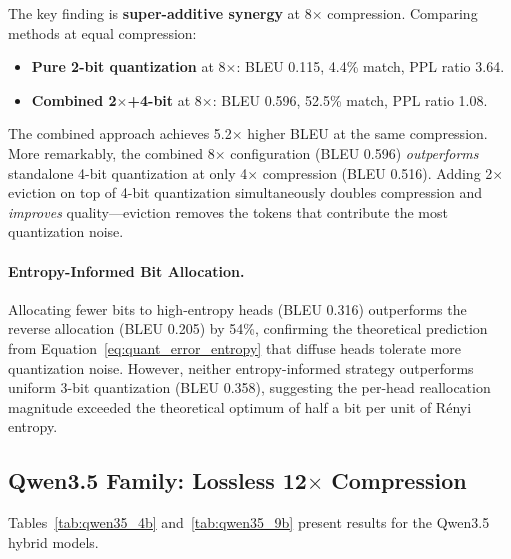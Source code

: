 \documentclass[11pt]{article}
\begin{document}
The key finding is \textbf{super-additive synergy} at 8$\times$ compression.  Comparing methods at equal compression:
\begin{itemize}[leftmargin=*]
    \item \textbf{Pure 2-bit quantization} at 8$\times$: BLEU 0.115, 4.4\% match, PPL ratio 3.64.
    \item \textbf{Combined 2$\times$+4-bit} at 8$\times$: BLEU 0.596, 52.5\% match, PPL ratio 1.08.
\end{itemize}
The combined approach achieves 5.2$\times$ higher BLEU at the same compression.  More remarkably, the combined 8$\times$ configuration (BLEU 0.596) \emph{outperforms} standalone 4-bit quantization at only 4$\times$ compression (BLEU 0.516).  Adding 2$\times$ eviction on top of 4-bit quantization simultaneously doubles compression and \emph{improves} quality---eviction removes the tokens that contribute the most quantization noise.

\paragraph{Entropy-Informed Bit Allocation.}
Allocating fewer bits to high-entropy heads (BLEU 0.316) outperforms the reverse allocation (BLEU 0.205) by 54\%, confirming the theoretical prediction from Equation~\ref{eq:quant_error_entropy} that diffuse heads tolerate more quantization noise.  However, neither entropy-informed strategy outperforms uniform 3-bit quantization (BLEU 0.358), suggesting the per-head reallocation magnitude exceeded the theoretical optimum of half a bit per unit of R\'{e}nyi entropy.

\subsection{Qwen3.5 Family: Lossless 12$\times$ Compression}
\label{sec:qwen35_results}

Tables~\ref{tab:qwen35_4b} and~\ref{tab:qwen35_9b} present results for the Qwen3.5 hybrid models.
\end{document}
